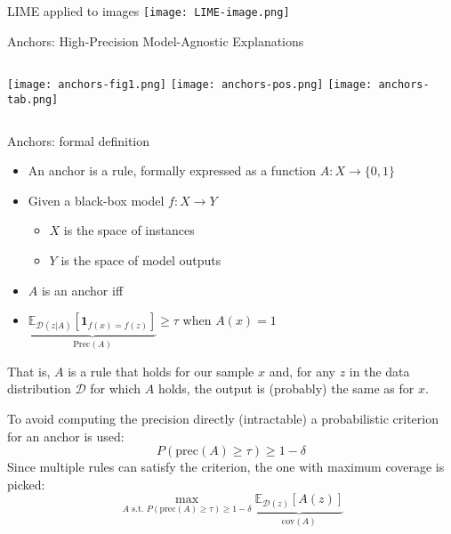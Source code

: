 \documentclass[aspectratio=169]{beamer}
\begin{document}

\begin{frame}{LIME applied to images}
\texttt{[image: LIME-image.png]}
\end{frame}


\begin{frame}{Anchors: High-Precision Model-Agnostic Explanations}
\begin{columns}
	 \centering
	\texttt{[image: anchors-fig1.png]} \pause
	 \centering
	\texttt{[image: anchors-pos.png]} \pause
	\texttt{[image: anchors-tab.png]}	
\end{columns}
\end{frame}


\begin{frame}{Anchors: formal definition}

\begin{itemize}
	\item An anchor is a rule, formally expressed as a function $A : X \rightarrow \{0,1\}$ \pause
	\item Given a black-box model $f : X \rightarrow Y$
	\begin{itemize}
		\item $X$ is the space of instances
		\item $Y$ is the space of model outputs
	\end{itemize} \pause
	\item $A$  is an anchor iff
	\item[] $\underbrace{\mathbb{E}_{\mathcal D (z | A)} \left[ \mathbf{1}_{f(x)=f(z)} \right] }_{\mathrm{Prec}(A)} \geq \tau$ when $A(x) = 1$
\end{itemize}  \pause
  That is, $A$ is a rule that holds for our sample $x$ and, for any $z$ in the data distribution $\mathcal D$ for which $A$ holds, the output is (probably) the same as for $x$. \pause
  
  To avoid computing the precision directly (intractable) a probabilistic criterion for an anchor is used:
  \[
  P( \mathrm{prec}(A) \geq \tau ) \geq 1 - \delta
  \]
  Since multiple rules can satisfy the criterion, the one with maximum coverage is picked:
  \[
  \max_{A \text{ s.t. } P(\mathrm{prec}(A) \geq \tau ) \geq 1 - \delta} \underbrace{ \mathbb E_{\mathcal D (z) } \left[ A(z) \right] }_{\mathrm{cov}(A)}
  \]
\end{frame}
\end{document}
